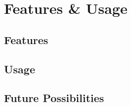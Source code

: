 
\chapter{Features {\&} Usage}

\label{ch:fetures}

\section{Features}\label{sec:features}


\section{Usage}\label{sec:usage}


\section{Future Possibilities}\label{sec:future}

